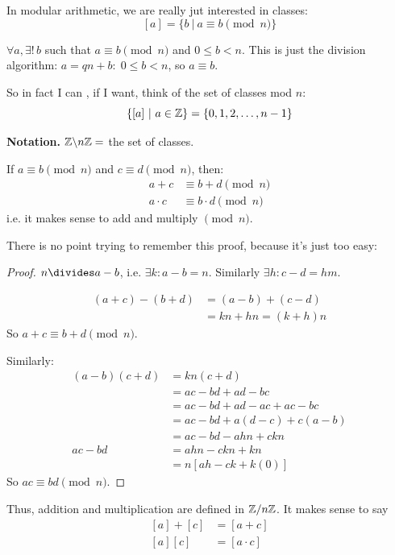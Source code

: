 \documentclass[10pt]{scrartcl}
\begin{document}
In modular arithmetic, we are really jut interested in classes: 
\[[a] = \{b ~|~ a \equiv b \pmod{n}\}\]

\begin{remark}
$\forall a, \exists!\, b$ such that $a \equiv b \pmod{n}$ and $0 \leq b < n$. This is just the division algorithm: $a = qn + b:\; 0 \leq b < n$, so $ a \equiv b$. 
\end{remark}

So in fact I can , if I want, think of the set of classes mod $n$: 
\[\{[a] ~|~ a \in\mathbb{Z}\} = \{0,1,2,\dots, n-1\}\]

\textbf{Notation.} $\mathbb{Z} \backslash n\mathbb{Z} = $ the set of classes.\\

\begin{proposition}
If $a \equiv b \pmod{n}$ and $c \equiv d \pmod{n}$, then:
\[
\begin{aligned}
  a + c &\equiv b + d \pmod{n}\\
  a \cdot c &\equiv b \cdot d \pmod{n}
\end{aligned}
\]
i.e. it makes sense to add and multiply $\pmod{n}$. 
\end{proposition}

There is no point trying to remember this proof, because it's just too easy:
\begin{proof}
$n \divides a -b$, i.e. $\exists k: a-b = n$. Similarly $\exists h: c -d = hm$. 

\[
\begin{aligned}
  (a+c) - (b+d) &= (a-b) + (c-d)\\
  &= kn + hn = (k+h)n
\end{aligned}
\]
So $a+c \equiv b + d \pmod{n}$. 

Similarly: 
\[
\begin{aligned}
  (a-b)(c+d) &= kn(c+d)\\
  &= ac - bd + ad - bc\\
  &= ac - bd + ad - ac + ac - bc\\
  &= ac - bd + a(d-c) + c(a-b)\\
  &= ac - bd - ahn + ckn\\
  ac - bd &= ahn - ckn + kn \\
  &= n[ah - ck + k(0)]
\end{aligned}
\]
So $ac \equiv bd \pmod{n}$. 
\end{proof}


Thus, addition and multiplication are defined in $\mathbb{Z} / n\mathbb{Z}$. It makes sense to say 
\[
\begin{aligned}
  [a] + [c] &= [a + c]\\
  [a][c] &= [a \cdot c]
\end{aligned}
\]
\end{document}
